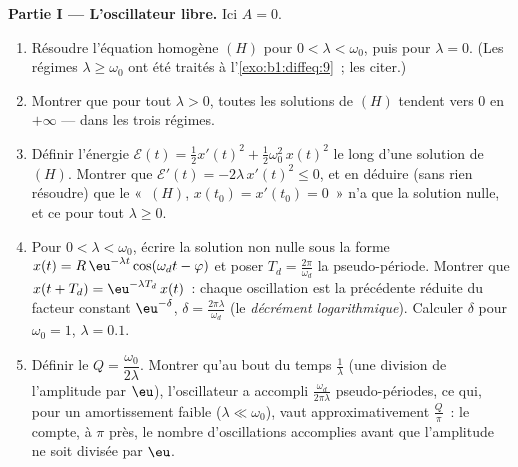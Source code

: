 \begin{problem}
\medskip
\noindent\textbf{Partie I --- L'oscillateur libre.} Ici $A = 0$.
\begin{enumerate}
  \item Résoudre l'équation homogène $(H)$ pour $0 < \lambda <
        \omega_0$, puis pour $\lambda = 0$. (Les régimes $\lambda
        \geq \omega_0$ ont été traités à l'\cref{exo:b1:diffeq:9}~;
        les citer.)
  \item Montrer que pour tout $\lambda > 0$, toutes les solutions de
        $(H)$ tendent vers $0$ en $+\infty$ --- dans les trois
        régimes.
  \item Définir l'énergie $\mathcal E(t) = \frac12 x'(t)^2 +
        \frac12\omega_0^2\,x(t)^2$ le long d'une solution de $(H)$.
        Montrer que $\mathcal E'(t) = -2\lambda\,x'(t)^2 \leq 0$, et
        en déduire (sans rien résoudre) que le 
        «~$(H)$, $x(t_0) = x'(t_0) = 0$~» n'a que la solution nulle,
        et ce pour tout $\lambda \geq 0$.
  \item Pour $0 < \lambda < \omega_0$, écrire la solution non nulle
        sous la forme $x(t) = R\,\eu^{-\lambda t}\cos(\omega_d t -
        \varphi)$ et poser $T_d = \frac{2\pi}{\omega_d}$ la
        pseudo-période. Montrer que $x(t + T_d) = \eu^{-\lambda
        T_d}\,x(t)$~: chaque oscillation est la précédente réduite du
        facteur constant $\eu^{-\delta}$, $\delta =
        \frac{2\pi\lambda}{\omega_d}$ (le \emph{décrément
        logarithmique}). Calculer $\delta$ pour $\omega_0 = 1$,
        $\lambda = 0.1$.
  \item Définir le \emph{} $Q =
        \dfrac{\omega_0}{2\lambda}$.
        Montrer qu'au bout du temps $\frac1\lambda$ (une division de
        l'amplitude par $\eu$), l'oscillateur a accompli
        $\frac{\omega_d}{2\pi\lambda}$ pseudo-périodes, ce qui, pour
        un amortissement faible ($\lambda \ll \omega_0$), vaut
        approximativement $\frac Q\pi$~: le  compte,
        à $\pi$ près, le nombre d'oscillations accomplies avant que
        l'amplitude ne soit divisée par $\eu$.
\end{enumerate}


\end{problem}
